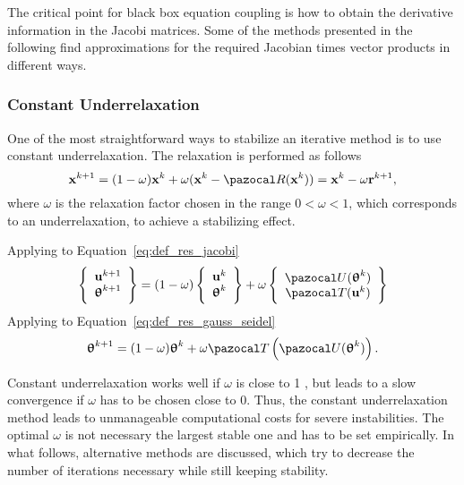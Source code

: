 The critical point for black box equation coupling is how to obtain the derivative information in the Jacobi matrices.
Some of the methods presented in the following find approximations for the required Jacobian times vector products in different ways.

\subsubsection{Constant Underrelaxation}

One of the most straightforward ways to stabilize an iterative method is to use constant underrelaxation. \cite{gatzhammer_efficient_2014}
The relaxation is performed as follows
\begin{equation} \label{eq:constant_relaxation}
\mathbf x^{k+1}=(1-\omega) \mathbf x^{k}+\omega(\mathbf x^k - \pazocal R(\mathbf x^k))=\mathbf x^{k} -\omega \mathbf{r}^{k+1},
\end{equation}
where \(\omega\) is the relaxation factor chosen in the range \(0<\omega<1\), which corresponds to an underrelaxation, to achieve a stabilizing effect.

Applying to Equation~\eqref{eq:def_res_jacobi}
\begin{equation}
  \left\{\begin{array}{c}
    \mathbf u^{k+1}\\
    \bm \uptheta^{k+1}
  \end{array}\right\} =
  (1-\omega)
  \left\{\begin{array}{c}
    \mathbf u^{k}\\
    \bm \uptheta^{k}
  \end{array}\right\}
  + \omega
  \left\{\begin{array}{c}
    \pazocal U(\bm\uptheta^k)\\
    \pazocal T(\mathbf u^k)
  \end{array}\right\}
\end{equation}
Applying to Equation~\eqref{eq:def_res_gauss_seidel}
\begin{equation}
  \bm\uptheta^{k+1} = (1-\omega)\bm\uptheta^k + \omega \pazocal T\left(\pazocal U(\bm \uptheta^k)\right).
\end{equation}


Constant underrelaxation works well if \(\omega\) is close to 1 , but leads to a slow convergence if \(\omega\) has to be chosen close to 0.
Thus, the constant underrelaxation method leads to unmanageable computational costs for severe instabilities.
The optimal \(\omega\) is not necessary the largest stable one \citet{gatzhammer_efficient_2014} and has to be set empirically.
In what follows, alternative methods are discussed, which try to decrease the number of iterations necessary while still keeping stability.

